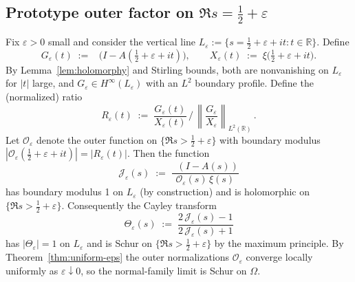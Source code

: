 \documentclass[11pt]{article}
\theoremstyle{remark}
\DeclareMathOperator{\dettwo}{det_2}
\begin{document}
\subsection{Prototype outer factor on \(\Re s=\tfrac12+\varepsilon\)}\label{subsec:outer-prototype}
Fix \(\varepsilon>0\) small and consider the vertical line \(L_{\varepsilon}:=\{s=\tfrac12+\varepsilon+it: t\in\mathbb R\}\). Define
\[
 G_{\varepsilon}(t)\;:=\;\dettwo\big(I-A(\tfrac12+\varepsilon+it)\big),\qquad X_{\varepsilon}(t)\;:=\;\xi\big(\tfrac12+\varepsilon+it\big).
\]
By Lemma~\ref{lem:holomorphy} and Stirling bounds, both are nonvanishing on $L_{\varepsilon}$ for \(|t|\) large, and $G_{\varepsilon}\in H^\infty(L_{\varepsilon})$ with an $L^2$ boundary profile. Define the (normalized) ratio
\[
 R_{\varepsilon}(t)\;:=\;\frac{G_{\varepsilon}(t)}{X_{\varepsilon}(t)}\,\Big/\,\left\|\frac{G_{\varepsilon}}{X_{\varepsilon}}\right\|_{L^2(\mathbb R)}\,.
\]
Let $\mathcal O_{\varepsilon}$ denote the outer function on $\{\Re s>\tfrac12+\varepsilon\}$ with boundary modulus $|\mathcal O_{\varepsilon}(\tfrac12+\varepsilon+it)|=|R_{\varepsilon}(t)|$. Then the function
\[
 \mathcal J_{\varepsilon}(s)\;:=\;\frac{\dettwo(I-A(s))}{\mathcal O_{\varepsilon}(s)\,\xi(s)}
\]
has boundary modulus 1 on $L_{\varepsilon}$ (by construction) and is holomorphic on $\{\Re s>\tfrac12+\varepsilon\}$. Consequently the Cayley transform
\[
 \Theta_{\varepsilon}(s)\;:=\;\frac{2\,\mathcal J_{\varepsilon}(s)-1}{2\,\mathcal J_{\varepsilon}(s)+1}
\]
has $|\Theta_{\varepsilon}|=1$ on $L_{\varepsilon}$ and is Schur on $\{\Re s>\tfrac12+\varepsilon\}$ by the maximum principle. By Theorem~\ref{thm:uniform-eps} the outer normalizations $\mathcal O_{\varepsilon}$ converge locally uniformly as $\varepsilon\downarrow 0$, so the normal-family limit is Schur on $\Omega$.
\end{document}
